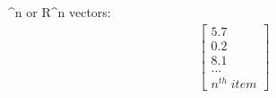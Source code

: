^{n} \; or \; R^{n} \; vectors:
\begin{align}
    \begin{bmatrix}
        5.7 \\
        0.2 \\
        8.1 \\
        ... \\
        n^{th} \; item
    \end{bmatrix}
\end{align}